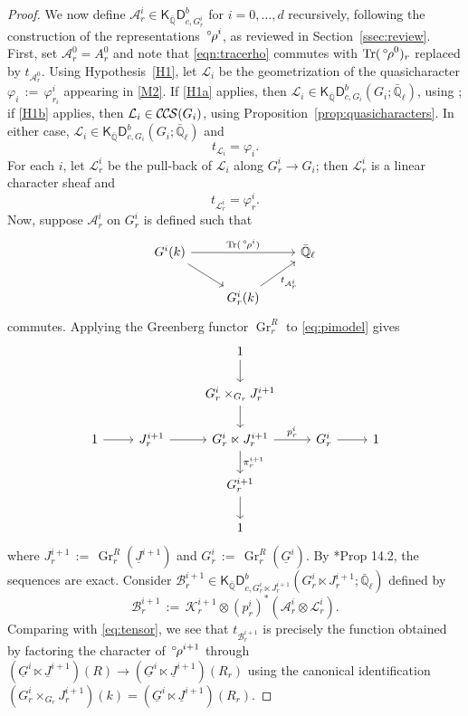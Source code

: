 \documentclass[10pt]{amsart}
\theoremstyle{plain}
\theoremstyle{definition}
\newcommand{\QQ}{{\mathbb{Q}}}
\newcommand{\EE}{\mathbb{\bar Q}_\ell}
\newcommand{\Fq}{k}
\DeclareMathOperator{\Gr}{Gr}
\DeclareMathOperator{\trace}{Tr}
\newcommand{\ceq}{{\, :=\, }}
\newcommand{\trFrob}[1]{t_{#1}}
\newcommand{\cs}[1]{{\mathcal{#1}}}
\newcommand{\CCS}{{\mathcal{C\hskip-.8pt C\hskip-0.8pt S}}}
\newcommand{\orho}{{\,^\circ \hskip-1pt \rho}}
\begin{document}
\begin{proof}
We now define $\cs{A}^i_r  \in \mathsf{K}_{\bar\QQ}\mathsf{D}^b_{c,G^i_r}$ for $i=0,\ldots ,d$ recursively, following the construction of the representations $\orho^i$, as reviewed in Section~\ref{ssec:review}.
First, set $\cs{A}_r^0 = A_r^0$ and note that \eqref{eqn:tracerho} commutes with $\trace(\orho^0)_r$ replaced by $\trFrob{\cs{A}_r^0}$.
Using Hypothesis~\ref{H1}, let $\cs{L}_i$ be the geometrization of the quasicharacter $\varphi_i \ceq \varphi^i_{r_i}$ appearing in \ref{M2}.
If \ref{H1a} applies, then $\cs{L}_i \in \mathsf{K}_{\bar\QQ}\mathsf{D}^b_{c,G_i}(G_i;\EE)$, using \cite{lusztig:disconnected1};
if \ref{H1b} applies, then $\cs{L}_i\in \CCS(G_i)$, using Proposition~\ref{prop:quasicharacters}.
In either case, $\cs{L}_i\in \mathsf{K}_{\bar\QQ}\mathsf{D}^b_{c,G_i}(G_i;\EE)$ and
\[
\trFrob{\cs{L}_i} = \varphi_i.
\]
For each $i$, let $\cs{L}^i_{r}$ be the pull-back of $\cs{L}_i$ along $G^i_{r} \to G_i$; then $\cs{L}^i_{r}$ is a linear character sheaf and
\[
\trFrob{\cs{L}^i_{r}} = \varphi^i_{r}.
\]
Now, suppose $\cs{A}^i_r$ on $G_r^i$ is defined such that
\[
\begin{tikzcd}
G^i(\Fq) \arrow{rr}{\trace(\orho^i)} \arrow{rd} && \EE\\
& G_r^i(\Fq) \arrow{ru}[swap]{\trFrob{\cs{A}_r^i}} & 
\end{tikzcd}
\]
commutes.
Applying the Greenberg functor $\Gr^{R}_r$ to \eqref{eq:pimodel} gives
\begin{equation}\label{eq:pi}
\begin{tikzcd}
\ && 1 \arrow{d} && \\
\ && G_r^{i}\times_{G_r} J_r^{i+1} \arrow{d} && \\
1 \arrow{r} & J_r^{i+1} \arrow{r} & G_r^i \ltimes J_r^{i+1} \arrow{d}{\pi_r^{i+1}} \arrow{r}{p_r^{i}} & G_r^i \arrow{r} & 1\\
&& G_r^{i+1} \arrow{d} && \\
&& 1 && 
\end{tikzcd}
\end{equation}
where $J_r^{i+1} \ceq \Gr^{R}_r(\underline{J}^{i+1})$ and $G_r^{i} \ceq \Gr^{R}_r(\underline{G}^{i})$.
By \cite{bertapelle-gonzales:Greenberg}*{Prop 14.2}, the sequences are exact.
Consider $\cs{B}_r^{i+1}\in \mathsf{K}_{\bar\QQ}\mathsf{D}^b_{c,G_r^{i}\ltimes J_r^{i+1}}(G_r^{i}\ltimes J_r^{i+1};\EE)$ defined by
\[
\cs{B}_r^{i+1} \ceq \cs{K}_r^{i+1} \otimes (p_r^{i})^*(\cs{A}_r^{i}\otimes \cs{L}_r^{i}).
\]
Comparing with \eqref{eq:tensor}, we see that $\trFrob{\cs{B}_r^{i+1}}$ is precisely the function obtained by factoring the character of $\orho^{i+1}$ through $(\underline{G}^{i}\ltimes \underline{J}^{i+1})(R) \to (\underline{G}^{i}\ltimes \underline{J}^{i+1})(R_r)$ using the canonical identification $(G_r^{i}\times_{G_r} J_r^{i+1})(\Fq) =  (\underline{G}^{i}\ltimes \underline{J}^{i+1})(R_r)$. 

\end{proof}
\end{document}
